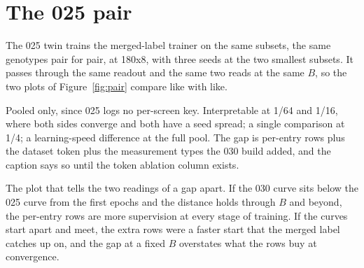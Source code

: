 
\section{The 025 pair}
\label{sec:pair}

The 025 twin trains the merged-label trainer on the same subsets, the same
genotypes pair for pair, at 180x8, with three seeds at the two smallest
subsets. It passes through the same readout and the same two reads at the same
$B$, so the two plots of Figure~\ref{fig:pair} compare like with like.


Pooled only, since 025 logs no per-screen key. Interpretable at 1/64 and 1/16,
where both sides converge and both have a seed spread; a single comparison at
1/4; a learning-speed difference at the full pool. The gap is per-entry rows
plus the dataset token plus the measurement types the 030 build added, and the
caption says so until the token ablation column exists.

The plot that tells the two readings of a gap apart. If the 030 curve sits below
the 025 curve from the first epochs and the distance holds through $B$ and
beyond, the per-entry rows are more supervision at every stage of training. If
the curves start apart and meet, the extra rows were a faster start that the
merged label catches up on, and the gap at a fixed $B$ overstates what the rows
buy at convergence.
